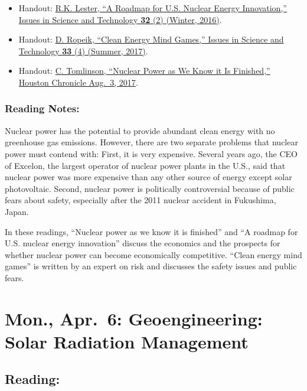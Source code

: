 \documentclass[
]{article}
\providecommand{\tightlist}{%
  \setlength{\itemsep}{0pt}\setlength{\parskip}{0pt}}
\begin{document}
\begin{itemize}
\tightlist
\item
  Handout:
  \href{http://issues.org/32-2/a-roadmap-for-u-s-nuclear-energy-innovation/}{R.K.
  Lester, ``A Roadmap for U.S. Nuclear Energy Innovation,'' Issues in
  Science and Technology \textbf{32} (2) (Winter, 2016)}.
\item
  Handout: \href{http://issues.org/33-4/clean-energy-mind-games/}{D.
  Ropeik, ``Clean Energy Mind Games,'' Issues in Science and Technology
  \textbf{33} (4) (Summer, 2017)}.
\item
  Handout:
  \href{https://www.houstonchronicle.com/business/columnists/tomlinson/article/Nuclear-power-as-we-know-it-is-finished-11727465.php}{C.
  Tomlinson, ``Nuclear Power as We Know it Is Finished,'' Houston
  Chronicle Aug.~3, 2017}.
\end{itemize}

\hypertarget{reading-notes-26}{%
\subsubsection{Reading Notes:}\label{reading-notes-26}}

Nuclear power has the potential to provide abundant clean energy with no
greenhouse gas emissions. However, there are two separate problems that
nuclear power must contend with: First, it is very expensive. Several
years ago, the CEO of Excelon, the largest operator of nuclear power
plants in the U.S., said that nuclear power was more expensive than any
other source of energy except solar photovoltaic. Second, nuclear power
is politically controversial because of public fears about safety,
especially after the 2011 nuclear accident in Fukushima, Japan.

In these readings, ``Nuclear power as we know it is finished'' and ``A
roadmap for U.S. nuclear energy innovation'' discuss the economics and
the prospects for whether nuclear power can become economically
competitive. ``Clean energy mind games'' is written by an expert on risk
and discusses the safety issues and public fears.

\hypertarget{mon.-apr.-6-geoengineering-solar-radiation-management}{%
\section{Mon., Apr.~6: Geoengineering: Solar Radiation
Management}\label{mon.-apr.-6-geoengineering-solar-radiation-management}}

\hypertarget{reading-35}{%
\subsection{Reading:}\label{reading-35}}
\end{document}
